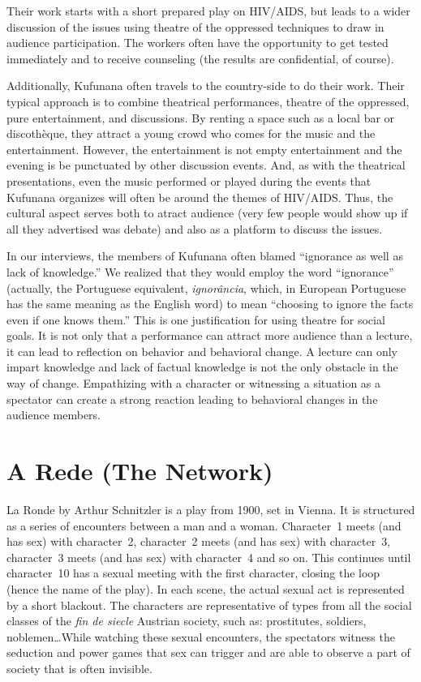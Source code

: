 \documentclass[article,twocolumn]{memoir}
\begin{document}
Their work starts with a short prepared play on HIV/AIDS, but leads to a wider
discussion of the issues using theatre of the oppressed techniques to draw in
audience participation. The workers often have the opportunity to get tested
immediately and to receive counseling (the results are confidential, of
course).

Additionally, Kufunana often travels to the country-side to do their work.
Their typical approach is to combine theatrical performances, theatre of the
oppressed, pure entertainment, and discussions. By renting a space such as a
local bar or discothèque, they attract a young crowd who comes for the music
and the entertainment. However, the entertainment is not empty entertainment
and the evening is be punctuated by other discussion events. And, as with the
theatrical presentations, even the music performed or played during the events
that Kufunana organizes will often be around the themes of HIV/AIDS. Thus, the
cultural aspect serves both to atract audience (very few people would show up
if all they advertised was debate) and also as a platform to discuss the
issues.

In our interviews, the members of Kufunana often blamed ``ignorance as well as
lack of knowledge.'' We realized that they would employ the word ``ignorance''
(actually, the Portuguese equivalent, \textit{ignor\^{a}ncia}, which, in
European Portuguese has the same meaning as the English word) to mean
``choosing to ignore the facts even if one knows them.'' This is one
justification for using theatre for social goals. It is not only that a
performance can attract more audience than a lecture, it can lead to reflection
on behavior and behavioral change. A lecture can only impart knowledge and lack
of factual knowledge is not the only obstacle in the way of change.
Empathizing with a character or witnessing a situation as a spectator can
create a strong reaction leading to behavioral changes in the audience members.

\chapter{A Rede (The Network)}

La Ronde by Arthur Schnitzler is a play from 1900, set in Vienna. It is
structured as a series of encounters between a man and a woman. Character~1
meets (and has sex) with character~2, character~2 meets (and has sex) with
character~3, character~3 meets (and has sex) with character~4 and so on. This
continues until character~10 has a sexual meeting with the first character,
closing the loop (hence the name of the play). In each scene, the actual sexual
act is represented by a short blackout. The characters are representative of
types from all the social classes of the \textit{fin de siecle} Austrian
society, such as: prostitutes, soldiers, noblemen\ldots While watching these
sexual encounters, the spectators witness the seduction and power games that
sex can trigger and are able to observe a part of society that is often
invisible.
\end{document}
